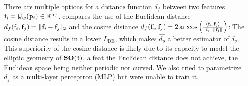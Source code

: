 
There are multiple options for a distance function $d_f$ between two features $\mathbf{f}_i = \mathcal{G}_w(\mathbf{p}_i) \in \mathbb{R}^{n_f}$.
 compares the use of the Euclidean distance $d_f(\mathbf{f}_i, \mathbf{f}_j) = \Vert \mathbf{f}_i - \mathbf{f}_j \Vert_2$ and the cosine distance $d_f(\mathbf{f}_i, \mathbf{f}_j) = 2 \arccos \left( \frac{\langle \mathbf{f}_i, \mathbf{f}_j \rangle}{\lVert \mathbf{f}_i \rVert \lVert \mathbf{f}_j \rVert} \right)$: The cosine distance results in a lower $L_\text{DE}$, which makes $\widehat{d_p}$ a better estimator of $d_q$.
This superiority of the cosine distance is likely due to its capacity to model the elliptic geometry of $\mathrm{\mathbf{SO}}(3)$, a feat the Euclidean distance does not achieve, the Euclidean space being neither periodic nor curved.
We also tried to parametrize $d_f$ as a multi-layer perceptron (MLP) but were unable to train it.


